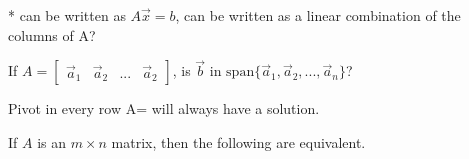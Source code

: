 \documentclass[11pt]{article} %
\begin{document}
* can be written as $A\vec{x} = b$, can be written as a linear combination of the columns of A?

If $A=
\begin{bmatrix}
\vec{a}_1 & \vec{a}_2 & ... & \vec{a}_2
\end{bmatrix}
$, is $\vec{b}$ in $\text{span}\{ \vec{a}_1, \vec{a}_2, ..., \vec{a}_n\}$?


Pivot in every row A= will always have a solution.

If $A$ is an $m \times n$ matrix, then the following are equivalent.
\end{document}

